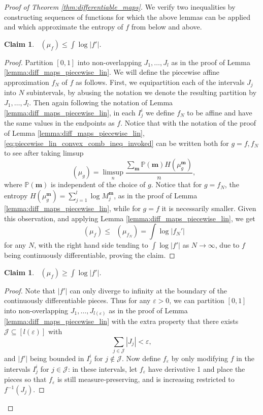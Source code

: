 \documentclass[11pt]{article}
\newcommand{\upperlinent}{\mathop{\overline{H}^{\mathrm{lin}}}}
\newcommand{\lowerlinent}{\mathop{\underline{H}^{\mathrm{lin}}}}
\newtheorem{claim}[theorem]{Claim}
\theoremstyle{definition}
\begin{document}
\begin{proof}[Proof of Theorem \ref{thm:differentiable_maps}]

    We verify two inequalities by constructing sequences of functions for which the above lemmas can be applied and which approximate the entropy of $f$ from below and above.

    \begin{claim}
        $\upperlinent(\mu_f)\leq \int \log |f'|$.
    \end{claim}
    
    \begin{proof}
    Partition $[0,1]$ into non-overlapping $J_1, \dots, J_{l}$ as in the proof of Lemma \ref{lemma:diff_maps_piecewise_lin}. We will define the piecewise affine approximation $f_N$ of $f$ as follows. First, we equipartition each of the intervals $J_j$ into $N$ subintervals, by abusing the notation we denote the resulting partition by $J_1, \dots, J_l$. Then again following the notation of Lemma \ref{lemma:diff_maps_piecewise_lin}, in each $I_j^i$ we define $f_N$ to be affine and have the same values in the endpoints as $f$.
    Notice that 
    with the notation of the proof of Lemma \ref{lemma:diff_maps_piecewise_lin},
    \eqref{eq:piecewise_lin_convex_comb_ineq_invoked} can be written both for $g=f, f_N$ to see after taking limsup
    $$\upperlinent(\mu_g)= \limsup_n \frac{\sum_{\mathbf{m}}\mathbb{P}(\mathbf{m})H(\mu_g^{\mathbf{m}})}{n},$$
    where $\mathbb{P}(\mathbf{m})$ is independent of the choice of $g$. Notice that for $g=f_N$, the entropy $H(\mu_g^{\mathbf{m}})=\sum_{j=1}^{l} \log M_j^{\mathbf{m}}$, as in the proof of Lemma \ref{lemma:diff_maps_piecewise_lin}, while for $g=f$ it is necessarily smaller. Given this observation, and applying Lemma \ref{lemma:diff_maps_piecewise_lin}, we get
    $$\upperlinent(\mu_f)\leq \upperlinent(\mu_{f_N})=\int \log |f_N'|$$
    for any $N$, with the right hand side tending to $\int \log |f'|$ as $N\to\infty$, due to $f$ being continuously differentiable, proving the claim.
    \end{proof}

    \begin{claim}
        $\lowerlinent(\mu_f)\geq \int \log |f'|$.
    \end{claim}

    \begin{proof}
    Note that $|f'|$ can only diverge to infinity at the boundary of the continuously differentiable pieces. Thus for any $\varepsilon>0$, we can  partition $[0,1]$ into non-overlapping $J_1, \dots, J_{l(\varepsilon)}$ as in the proof of Lemma \ref{lemma:diff_maps_piecewise_lin} with the extra property that there exists $\mathcal{J}\subseteq [l(\varepsilon)]$ with
    $$\sum_{j\in \mathcal{J}}|J_j|<\varepsilon,$$
    and $|f'|$ being bounded in $I_j^i$ for $j\notin \mathcal{J}$. Now define $f_{\varepsilon}$ by only modifying $f$ in the intervals $I_j^i$ for $j\in \mathcal{J}$: in these intervals, let $f_{\varepsilon}$ have derivative 1 and place the pieces so that $f_{\varepsilon}$ is still measure-preserving, and is increasing restricted to $f^{-1}(J_j)$.


\end{proof}
\end{proof}
\end{document}
